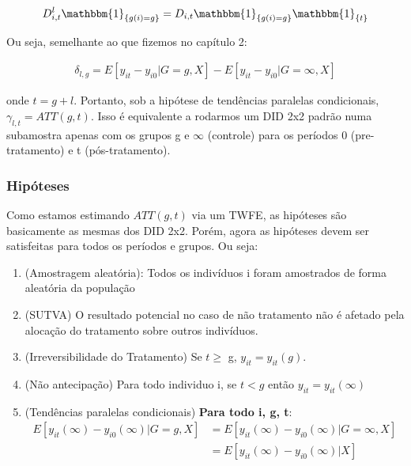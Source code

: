 \documentclass[portugues]{article}
\begin{document}
\[\begin{split}
    D^l_{i,t} \mathbbm{1}_{\{g(i) = g\}}= D_{i,t} \mathbbm{1}_{\{g(i) = g\}} \mathbbm{1}_{\{t\}}
\end{split}\]

Ou seja, semelhante ao que fizemos no capítulo 2:

\[\begin{split}
    \delta_{l,g} = E[y_{it} - y_{i0} | G=g, X] - E[y_{it} - y_{i0} | G=\infty, X]
\end{split}\]

\noindent onde $t = g+l$.
Portanto, sob a hipótese de tendências paralelas condicionais, $\gamma_{l,t} = ATT(g,t)$. Isso é equivalente a rodarmos um DID 2x2 padrão numa subamostra apenas com os grupos g e $\infty$ (controle)  para os períodos 0 (pre-tratamento) e t (pós-tratamento). 

\subsubsection{Hipóteses}

Como estamos estimando $ATT(g,t)$ via um TWFE, as hipóteses são basicamente as mesmas dos DID 2x2. Porém, agora as hipóteses devem ser satisfeitas para todos os períodos e grupos. Ou seja:

\begin{boxB}
    \begin{enumerate}
        \item (Amostragem aleatória): Todos os indivíduos i foram amostrados de forma aleatória da população
        \item (SUTVA) O resultado potencial no caso de não tratamento não é afetado pela alocação do tratamento sobre outros indivíduos.
        \item (Irreversibilidade do Tratamento) Se $t\geq$ g, $y_{it} = y_{it}(g)$. 
        \item (Não antecipação) Para todo individuo i, se $t < g$ então $y_{it} = y_{it}(\infty)$
        \item (Tendências paralelas condicionais) \textbf{Para todo i, g, t}: 
        \[
        \begin{split}
            E[y_{it}(\infty) - y_{i0}(\infty) | G=g, X] &= E[y_{it}(\infty) - y_{i0}(\infty)|G=\infty, X] \\
                                                        &= E[y_{it}(\infty) - y_{i0}(\infty)|X]
        \end{split}
        \]
    \end{enumerate}
\end{boxB}
\end{document}
